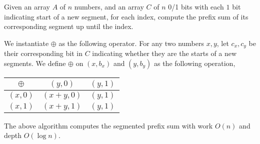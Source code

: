    
   \begin{definition}
   Given an array $A$ of $n$ numbers, and an array $C$ of $n$ 0/1 bits with each $1$ bit indicating start of a new segment, for each index, compute the prefix sum of its corresponding segment up until the index.
   \end{definition}
   \begin{definition}
   	We instantiate $\oplus$ as the following operator. For any two numbers $x,y$, let $c_x, c_y$ be their corresponding bit in $C$ indicating whether they are the starts of a new segments. We define $\oplus$ on $(x,b_x)$ and $(y,b_y)$ as the following operation,
   	\begin{center}
\begin{tabular}{ |c|c|c| } 
\hline
$\oplus$ & $(y,0)$ & $(y,1)$ 
\\ \hline $(x,0)$ & $(x+ y, 0)$ & $(y,1)$  
\\ \hline
 $(x,1)$ & $(x+ y, 1)$ & $(y,1)$\\ \hline
\end{tabular}
\end{center}
   \end{definition}
   
   \begin{claim}
   	The above algorithm computes the segmented prefix sum with work $O(n)$ and depth $O(\log n)$.
   \end{claim}
   
